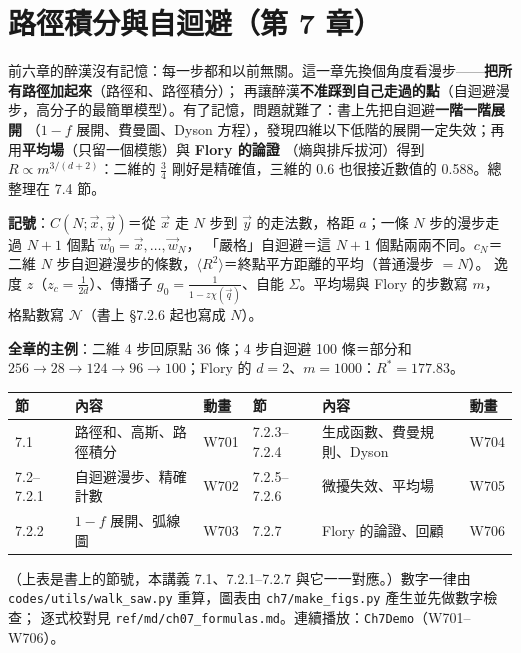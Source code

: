 

\section{路徑積分與自迴避（第 7 章）}

\begin{keybox}[先看這裡]
前六章的醉漢沒有記憶：每一步都和以前無關。這一章先換個角度看漫步——\textbf{把所有路徑加起來}（路徑和、路徑積分）；
再讓醉漢\textbf{不准踩到自己走過的點}（自迴避漫步，高分子的最簡單模型）。有了記憶，問題就難了：書上先把自迴避\textbf{一階一階展開}
（$1-f$ 展開、費曼圖、Dyson 方程），發現四維以下低階的展開一定失效；再用\textbf{平均場}（只留一個模態）與 \textbf{Flory 的論證}
（熵與排斥拔河）得到 $R\propto m^{3/(d+2)}$：二維的 $\frac34$ 剛好是精確值，三維的 0.6 也很接近數值的 0.588。總整理在 7.4 節。

\textbf{記號}：$C(N;\vec x,\vec y)$＝從 $\vec x$ 走 $N$ 步到 $\vec y$ 的走法數，格距 $a$；一條 $N$ 步的漫步走過 $N+1$ 個點 $\vec w_0=\vec x,\dots,\vec w_N$，
「嚴格」自迴避＝這 $N+1$ 個點兩兩不同。$c_N$＝二維 $N$ 步自迴避漫步的條數，$\langle R^2\rangle$＝終點平方距離的平均（普通漫步 $=N$）。
逸度 $z$（$z_c=\frac1{2d}$）、傳播子 $g_0=\frac1{1-z\chi(\vec q)}$、自能 $\Sigma$。平均場與 Flory 的步數寫 $m$，格點數寫 $\mathcal N$（書上 §7.2.6 起也寫成 $N$）。

\textbf{全章的主例}：二維 4 步回原點 36 條；4 步自迴避 100 條＝部分和 $256\to28\to124\to96\to100$；Flory 的 $d=2$、$m=1000$：$R^*=177.83$。
\begin{center}
\small
\begin{tabular}{@{}lll@{\qquad}lll@{}}
\toprule
節 & 內容 & 動畫 & 節 & 內容 & 動畫\\
\midrule
7.1 & 路徑和、高斯、路徑積分 & W701 & 7.2.3--7.2.4 & 生成函數、費曼規則、Dyson & W704\\
7.2--7.2.1 & 自迴避漫步、精確計數 & W702 & 7.2.5--7.2.6 & 微擾失效、平均場 & W705\\
7.2.2 & $1-f$ 展開、弧線圖 & W703 & 7.2.7 & Flory 的論證、回顧 & W706\\
\bottomrule
\end{tabular}
\end{center}
（上表是書上的節號，本講義 7.1、7.2.1--7.2.7 與它一一對應。）數字一律由 \texttt{codes/utils/walk\_saw.py} 重算，圖表由 \texttt{ch7/make\_figs.py} 產生並先做數字檢查；
逐式校對見 \texttt{ref/md/ch07\_formulas.md}。連續播放：\texttt{Ch7Demo}（W701--W706）。
\end{keybox}

